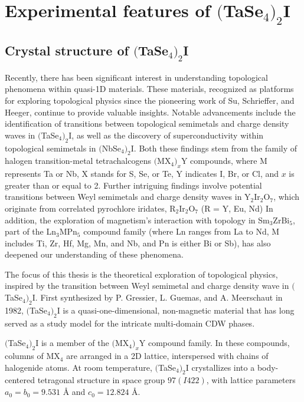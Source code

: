 \section{Experimental features of $($TaSe$_4)_2$I}
\subsection{Crystal structure of $($TaSe$_4)_2$I}
Recently, there has been significant interest in understanding topological phenomena within quasi-1D materials. These materials, recognized as platforms for exploring topological physics since the pioneering work of Su, Schrieffer, and Heeger\cite{su1979solitons}, continue to provide valuable insights. Notable advancements include the identification of transitions between topological semimetals and charge density waves in $($TaSe$_4)_2$I\cite{shi2021charge,gooth2019axionic,sinchenko2022does,mu2021suppression,nenno2020axion,yi2021surface, zhang2020first}, as well as the discovery of superconductivity within topological semimetals in $($NbSe$_4)_2$I\cite{pei2021pressure}. Both these findings stem from the family of halogen transition-metal tetrachalcogens $($MX$_4)_x$Y\cite{van2001structure} compounds, where M represents Ta or Nb, X stands for S, Se, or Te, Y indicates I, Br, or Cl, and $x$ is greater than or equal to 2. Further intriguing findings involve potential transitions between Weyl semimetals and charge density waves in Y$_2$Ir$_2$O$_7$, which originate from correlated pyrochlore iridates, R$_2$Ir$_2$O$_7$ (R = Y, Eu, Nd)\cite{juyal2022possible}
In addition, the exploration of magnetism's interaction with topology in Sm$_3$ZrBi$_5$\cite{khoury2022class}, part of the Ln$_3$MPn$_5$ compound family (where Ln ranges from La to Nd, M includes Ti, Zr, Hf, Mg, Mn, and Nb, and Pn is either Bi or Sb), has also deepened our understanding of these phenomena. 


The focus of this thesis is the theoretical exploration of topological physics, inspired by the transition between Weyl semimetal and charge density wave in $($TaSe$_4)_2$I. First synthesized by P. Gressier, L. Guemas, and A. Meerschaut in 1982\cite{gressier1982preparation}, $($TaSe$_4)_2$I is a quasi-one-dimensional, non-magnetic material that has long served as a study model for the intricate multi-domain CDW phases\cite{van2001structure}.

$($TaSe$_4)_2$I is a member of the $($MX$_4)_x$Y compound family. In these compounds, columns of MX$_4$ are arranged in a 2D lattice, interspersed with chains of halogenide atoms. At room temperature, $($TaSe$_4)_2$I crystallizes into a body-centered tetragonal structure in space group $97(I422)$, with lattice parameters $a_0 = b_0= 9.531$ Å and $c_0= 12.824$ Å.


